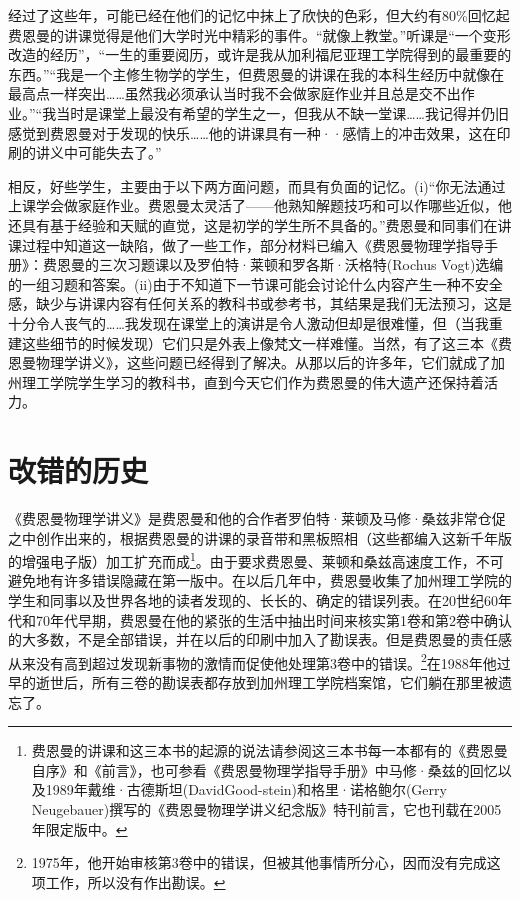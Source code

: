 \documentclass[UTF8, 12pt, a4paper, twoside]{ctexbook}
\begin{document}
经过了这些年，可能已经在他们的记忆中抹上了欣快的色彩，但大约有80\%回忆起费恩曼的讲课觉得是他们大学时光中精彩的事件。“就像上教堂。”听课是“一个变形改造的经历”，“一生的重要阅历，或许是我从加利福尼亚理工学院得到的最重要的东西。”“我是一个主修生物学的学生，但费恩曼的讲课在我的本科生经历中就像在最高点一样突出……虽然我必须承认当时我不会做家庭作业并且总是交不出作业。”“我当时是课堂上最没有希望的学生之一，但我从不缺一堂课……我记得并仍旧感觉到费恩曼对于发现的快乐……他的讲课具有一种··感情上的冲击效果，这在印刷的讲义中可能失去了。”

相反，好些学生，主要由于以下两方面问题，而具有负面的记忆。(i)“你无法通过上课学会做家庭作业。费恩曼太灵活了——他熟知解题技巧和可以作哪些近似，他还具有基于经验和天赋的直觉，这是初学的学生所不具备的。”费恩曼和同事们在讲课过程中知道这一缺陷，做了一些工作，部分材料已编入《费恩曼物理学指导手册》：费恩曼的三次习题课以及罗伯特·莱顿和罗各斯·沃格特(Rochus Vogt)选编的一组习题和答案。(ii)由于不知道下一节课可能会讨论什么内容产生一种不安全感，缺少与讲课内容有任何关系的教科书或参考书，其结果是我们无法预习，这是十分令人丧气的……我发现在课堂上的演讲是令人激动但却是很难懂，但（当我重建这些细节的时候发现）它们只是外表上像梵文一样难懂。当然，有了这三本《费恩曼物理学讲义》，这些问题已经得到了解决。从那以后的许多年，它们就成了加州理工学院学生学习的教科书，直到今天它们作为费恩曼的伟大遗产还保持着活力。

\section*{改错的历史}

《费恩曼物理学讲义》是费恩曼和他的合作者罗伯特·莱顿及马修·桑兹非常仓促之中创作出来的，根据费恩曼的讲课的录音带和黑板照相（这些都编入这新千年版的增强电子版）加工扩充而成\footnote{费恩曼的讲课和这三本书的起源的说法请参阅这三本书每一本都有的《费恩曼自序》和《前言》，也可参看《费恩曼物理学指导手册》中马修·桑兹的回忆以及1989年戴维·古德斯坦(DavidGood-stein)和格里·诺格鲍尔(Gerry Neugebauer)撰写的《费恩曼物理学讲义纪念版》特刊前言，它也刊载在2005年限定版中。}。由于要求费恩曼、莱顿和桑兹高速度工作，不可避免地有许多错误隐藏在第一版中。在以后几年中，费恩曼收集了加州理工学院的学生和同事以及世界各地的读者发现的、长长的、确定的错误列表。在20世纪60年代和70年代早期，费恩曼在他的紧张的生活中抽出时间来核实第1卷和第2卷中确认的大多数，不是全部错误，并在以后的印刷中加入了勘误表。但是费恩曼的责任感从来没有高到超过发现新事物的激情而促使他处理第3卷中的错误。\footnote{1975年，他开始审核第3卷中的错误，但被其他事情所分心，因而没有完成这项工作，所以没有作出勘误。}在1988年他过早的逝世后，所有三卷的勘误表都存放到加州理工学院档案馆，它们躺在那里被遗忘了。
\end{document}
